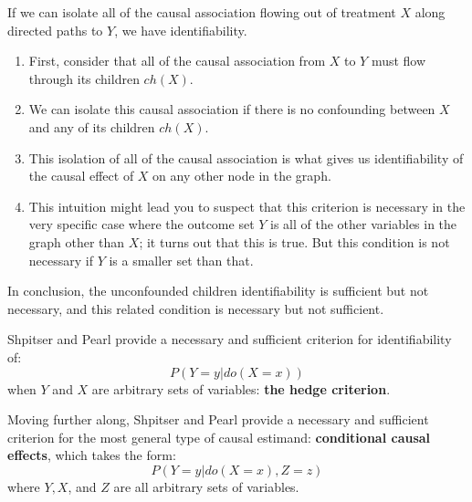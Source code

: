 If we can isolate all of the causal association flowing out of treatment $X$ along directed paths to $Y$, we have identifiability.
\begin{enumerate}
    \item First, consider that all of the causal association from $X$ to $Y$ must flow through its children $ch(X)$.
    \item We can isolate this causal association if there is no confounding between $X$ and any of its children $ch(X)$.
    \item This isolation of all of the causal association is what gives us identifiability of the causal effect of $X$ on any other node in the graph.
    \item This intuition might lead you to suspect that this criterion is necessary in the very specific case where the outcome set $Y$ is all of the other variables in the graph other than $X$; it turns out that this is true. But this condition is not necessary if $Y$ is a smaller set than that.
\end{enumerate}

In conclusion, the unconfounded children identifiability is sufficient but not necessary, and
this related condition is necessary but not sufficient.

Shpitser and Pearl provide a necessary and sufficient criterion for identifiability of:
\begin{equation}
    P(Y = y|do(X = x))
\end{equation}
when $Y$ and $X$ are arbitrary sets of variables: \textbf{the hedge criterion}.

Moving further along, Shpitser and Pearl provide a necessary and sufficient criterion for the most general type of causal estimand: \textbf{conditional causal effects}, which takes the form:
\begin{equation}
    P(Y = y|do(X=x), Z = z)
\end{equation}
where $Y, X$, and $Z$ are all arbitrary sets of variables.